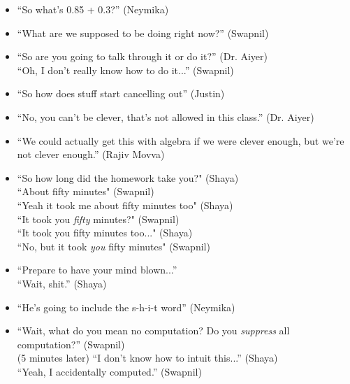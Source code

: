 \documentclass[11pt]{article}
\theoremstyle{definition}
\begin{document}
\begin{itemize}
\item ``So what's 0.85 + 0.3?'' (Neymika)
\item ``What are we supposed to be doing right now?'' (Swapnil)
\item ``So are you going to talk through it or do it?'' (Dr. Aiyer) \\ ``Oh, I don't really know how to do it...'' (Swapnil)
\item ``So how does stuff start cancelling out'' (Justin)
\item ``No, you can't be clever, that’s not allowed in this class.'' (Dr. Aiyer)
\item ``We could actually get this with algebra if we were clever enough, but we’re not clever enough.'' (Rajiv Movva)
\item ``So how long did the homework take you?" (Shaya) \\ ``About fifty minutes" (Swapnil) \\ ``Yeah it took me about fifty minutes too" (Shaya) \\ ``It took you \textit{fifty} minutes?" (Swapnil) \\ ``It took you fifty minutes too..." (Shaya) \\ ``No, but it took \textit{you} fifty minutes" (Swapnil)
\item ``Prepare to have your mind blown...'' \\ ``Wait, shit.'' (Shaya)
\item ``He's going to include the s-h-i-t word'' (Neymika)
\item ``Wait, what do you mean no computation? Do you \textit{suppress} all computation?'' (Swapnil) \\ (5 minutes later) ``I don't know how to intuit this...'' (Shaya) \\ ``Yeah, I accidentally computed.'' (Swapnil)
\end{itemize}
\end{document}
